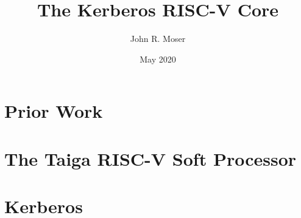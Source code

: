 \documentclass[a4paper,12pt]{book}
\begin{document}
\author{John R. Moser}
\title{The Kerberos RISC-V Core}
\date{May 2020}

\frontmatter
\maketitle

\cleardoublepage
\tableofcontents

\mainmatter
\part{Prior Work}




\part{The Taiga RISC-V Soft Processor}

\part{Kerberos}

\backmatter
\end{document}
